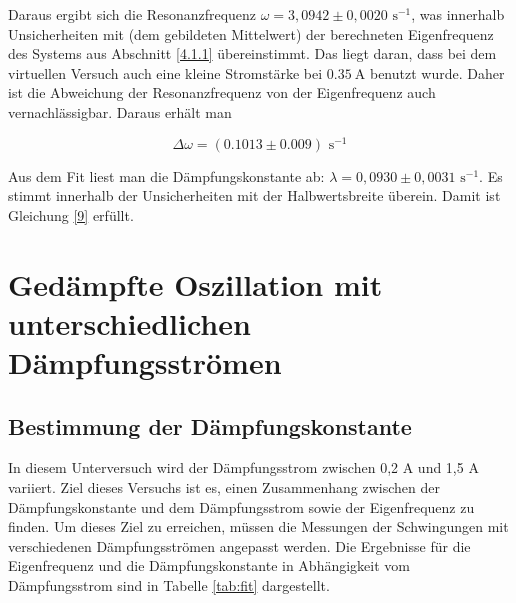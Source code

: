 \documentclass{article}
\begin{document}
Daraus ergibt sich die Resonanzfrequenz $\omega = 3,0942\pm 0,0020$ $\text{s}^{-1}$, was innerhalb Unsicherheiten mit (dem gebildeten Mittelwert) der berechneten Eigenfrequenz des Systems aus Abschnitt  \ref{4.1.1} übereinstimmt. Das liegt daran, dass bei dem virtuellen Versuch auch eine kleine Stromstärke bei $\SI{0,35}{\ampere}$ benutzt wurde. Daher ist die Abweichung der Resonanzfrequenz von der Eigenfrequenz auch vernachlässigbar. Daraus erhält man

\begin{equation}
\Delta \omega = (0.1013 \pm 0.009) \text{ s}^{-1}
\end{equation}

Aus dem Fit liest man die Dämpfungskonstante ab:  $\lambda = 0,0930 \pm 0,0031$ $\text{s}^{-1}$. Es stimmt innerhalb der Unsicherheiten mit der Halbwertsbreite überein. Damit ist Gleichung \ref{9} erfüllt.


\section{Gedämpfte Oszillation mit unterschiedlichen Dämpfungsströmen}

\subsection{Bestimmung der Dämpfungskonstante}
In diesem Unterversuch wird der Dämpfungsstrom zwischen 0,2 A und 1,5 A variiert. Ziel dieses Versuchs ist es, einen Zusammenhang zwischen der Dämpfungskonstante und dem Dämpfungsstrom sowie der Eigenfrequenz zu finden. Um dieses Ziel zu erreichen, müssen die Messungen der Schwingungen mit verschiedenen Dämpfungsströmen angepasst werden. Die Ergebnisse für die Eigenfrequenz und die Dämpfungskonstante in Abhängigkeit vom Dämpfungsstrom sind in Tabelle \ref{tab:fit} dargestellt.
\end{document}

